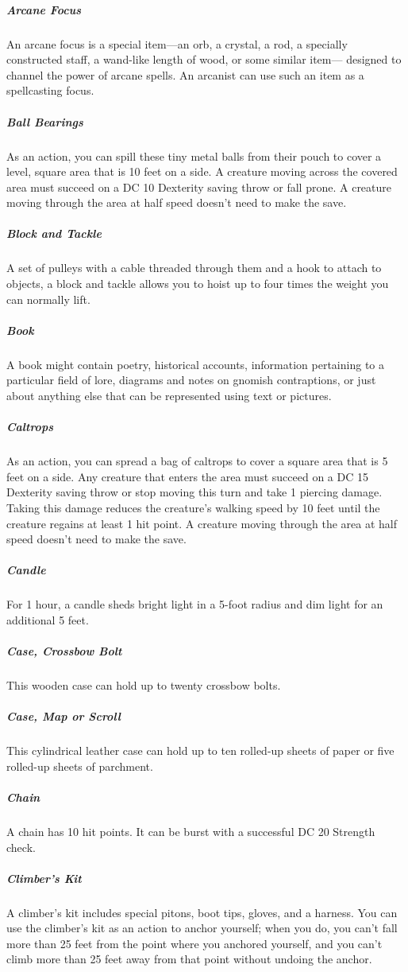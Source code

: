 \subparagraph*{Arcane Focus} An arcane focus is a special item—an orb, a crystal, a rod, a specially constructed staff, a wand-like length of wood, or some similar item— designed to channel the power of arcane spells. An arcanist can use such an item as a spellcasting focus.

\subparagraph*{Ball Bearings} As an action, you can spill these tiny metal balls from their pouch to cover a level, square area that is 10 feet on a side. A creature moving across the covered area must succeed on a DC 10 Dexterity saving throw or fall prone. A creature moving through the area at half speed doesn't need to make the save.

\subparagraph*{Block and Tackle} A set of pulleys with a cable threaded through them and a hook to attach to objects, a block and tackle allows you to hoist up to four times the weight you can normally lift.

\subparagraph*{Book} A book might contain poetry, historical accounts, information pertaining to a particular field of lore, diagrams and notes on gnomish contraptions, or just about anything else that can be represented using text or pictures.

\subparagraph*{Caltrops} As an action, you can spread a bag of caltrops to cover a square area that is 5 feet on a side. Any creature that enters the area must succeed on a DC 15 Dexterity saving throw or stop moving this turn and take 1 piercing damage. Taking this damage reduces the creature's walking speed by 10 feet until the creature regains at least 1 hit point. A creature moving through the area at half speed doesn't need to make the save.

\subparagraph*{Candle} For 1 hour, a candle sheds bright light in a 5-foot radius and dim light for an additional 5 feet.

\subparagraph*{Case, Crossbow Bolt} This wooden case can hold up to twenty crossbow bolts.

\subparagraph*{Case, Map or Scroll} This cylindrical leather case can hold up to ten rolled-up sheets of paper or five rolled-up sheets of parchment.

\subparagraph*{Chain} A chain has 10 hit points. It can be burst with a successful DC 20 Strength check.

\subparagraph*{Climber's Kit} A climber's kit includes special pitons, boot tips, gloves, and a harness. You can use the climber's kit as an action to anchor yourself; when you do, you can't fall more than 25 feet from the point where you anchored yourself, and you can't climb more than 25 feet away from that point without undoing the anchor.

